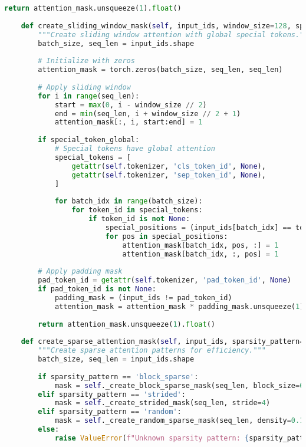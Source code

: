 \begin{lstlisting}[language=Python, caption=Advanced attention masking patterns]
        return attention_mask.unsqueeze(1).float()
        
    def create_sliding_window_mask(self, input_ids, window_size=128, special_token_global=True):
        """Create sliding window attention with global special tokens."""
        batch_size, seq_len = input_ids.shape
        
        # Initialize with zeros
        attention_mask = torch.zeros(batch_size, seq_len, seq_len)
        
        # Apply sliding window
        for i in range(seq_len):
            start = max(0, i - window_size // 2)
            end = min(seq_len, i + window_size // 2 + 1)
            attention_mask[:, i, start:end] = 1
            
        if special_token_global:
            # Special tokens have global attention
            special_tokens = [
                getattr(self.tokenizer, 'cls_token_id', None),
                getattr(self.tokenizer, 'sep_token_id', None),
            ]
            
            for batch_idx in range(batch_size):
                for token_id in special_tokens:
                    if token_id is not None:
                        special_positions = (input_ids[batch_idx] == token_id).nonzero(as_tuple=True)[0]
                        for pos in special_positions:
                            attention_mask[batch_idx, pos, :] = 1
                            attention_mask[batch_idx, :, pos] = 1
                            
        # Apply padding mask
        pad_token_id = getattr(self.tokenizer, 'pad_token_id', None)
        if pad_token_id is not None:
            padding_mask = (input_ids != pad_token_id)
            attention_mask = attention_mask * padding_mask.unsqueeze(1) * padding_mask.unsqueeze(2)
            
        return attention_mask.unsqueeze(1).float()
        
    def create_sparse_attention_mask(self, input_ids, sparsity_pattern='block_sparse'):
        """Create sparse attention patterns for efficiency."""
        batch_size, seq_len = input_ids.shape
        
        if sparsity_pattern == 'block_sparse':
            mask = self._create_block_sparse_mask(seq_len, block_size=64)
        elif sparsity_pattern == 'strided':
            mask = self._create_strided_mask(seq_len, stride=4)
        elif sparsity_pattern == 'random':
            mask = self._create_random_sparse_mask(seq_len, density=0.1)
        else:
            raise ValueError(f"Unknown sparsity pattern: {sparsity_pattern}")
            

\end{lstlisting}
